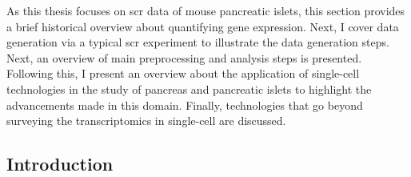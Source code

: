 
\begin{Abstract}
\vspace{3mm}
As this thesis focuses on \gls{scr} data of mouse pancreatic islets, this section
provides a brief historical overview about quantifying gene expression. Next, I cover data generation via a typical \gls{scr} experiment to illustrate the data generation steps. Next, an overview of main preprocessing and analysis steps is presented. Following this, I present an overview about the application of single-cell technologies in the study of pancreas and pancreatic islets to highlight the advancements made in this domain. Finally, technologies that go beyond surveying the transcriptomics in single-cell are discussed. 
\vspace{3mm}
\end{Abstract}
\vspace{3mm}


\subsection{Introduction}
\label{sec:scrna_intro}


